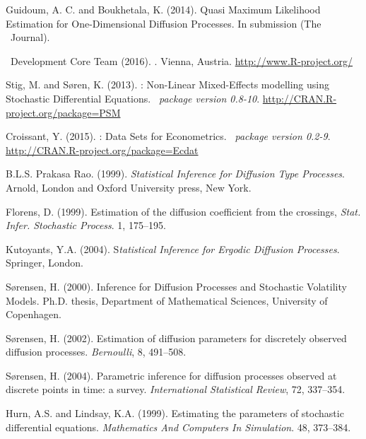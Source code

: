 \begin{thebibliography}{1}
Guidoum, A. C. and Boukhetala, K. (2014).
\newblock Quasi Maximum Likelihood Estimation for One-Dimensional Diffusion Processes.
\newblock In submission (The \R~Journal).

\R~Development Core Team (2016).
.
\newblock Vienna, Austria.
\newblock \url{http://www.R-project.org/}

Stig, M. and S{\o}ren, K. (2013).
\newblock {}: Non-Linear Mixed-Effects modelling using Stochastic Differential Equations.
\newblock \emph{\R~package version 0.8-10}.
\newblock \url{http://CRAN.R-project.org/package=PSM}

Croissant, Y. (2015).
\newblock {}: Data Sets for Econometrics.
\newblock \emph{\R~package version 0.2-9}.
\newblock \url{http://CRAN.R-project.org/package=Ecdat}

B.L.S. Prakasa Rao. (1999).
\newblock \emph{Statistical Inference for Diffusion Type Processes}.
\newblock Arnold, London and Oxford University press, New York.

Florens, D. (1999).
\newblock Estimation of the diffusion coefficient from the crossings,
\newblock \emph{Stat. Infer. Stochastic Process}. 1, 175--195.

Kutoyants, Y.A. (2004).
\newblock S\emph{tatistical Inference for Ergodic Diffusion Processes}.
\newblock Springer, London.

S{\o}rensen, H. (2000).
\newblock Inference for Diffusion Processes and Stochastic Volatility Models.
\newblock Ph.D. thesis, Department of Mathematical Sciences, University of Copenhagen.

S{\o}rensen, H. (2002).
\newblock Estimation of diffusion parameters for discretely observed diffusion processes.
\newblock \emph{Bernoulli}, 8, 491--508.

S{\o}rensen, H. (2004).
\newblock Parametric inference for diffusion processes observed at discrete points in time: a survey.
\newblock \emph{International Statistical Review}, 72, 337--354.

Hurn, A.S. and Lindsay, K.A. (1999).
\newblock Estimating the parameters of stochastic differential equations.
\newblock \emph{Mathematics And Computers In Simulation}. 48, 373--384.


\end{thebibliography}
